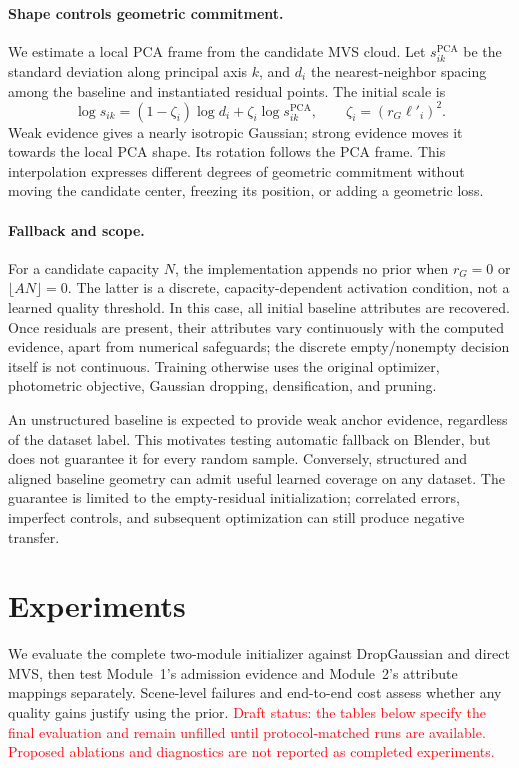 \documentclass{article}
\newcommand{\PH}[1]{\textcolor{red}{#1}}
\begin{document}
\paragraph{Shape controls geometric commitment.}
We estimate a local PCA frame from the candidate MVS cloud. Let $s^{\mathrm{PCA}}_{ik}$ be the standard deviation along principal axis $k$, and $d_i$ the nearest-neighbor spacing among the baseline and instantiated residual points. The initial scale is
\begin{equation}
\log s_{ik}=(1-\zeta_i)\log d_i+
\zeta_i\log s^{\mathrm{PCA}}_{ik},
\qquad
\zeta_i=(r_G\ell'_i)^2.
\label{eq:shape}
\end{equation}
Weak evidence gives a nearly isotropic Gaussian; strong evidence moves it towards the local PCA shape. Its rotation follows the PCA frame. This interpolation expresses different degrees of geometric commitment without moving the candidate center, freezing its position, or adding a geometric loss.

\paragraph{Fallback and scope.}
For a candidate capacity $N$, the implementation appends no prior when $r_G=0$ or $\lfloor AN\rfloor=0$. The latter is a discrete, capacity-dependent activation condition, not a learned quality threshold. In this case, all initial baseline attributes are recovered. Once residuals are present, their attributes vary continuously with the computed evidence, apart from numerical safeguards; the discrete empty/nonempty decision itself is not continuous. Training otherwise uses the original optimizer, photometric objective, Gaussian dropping, densification, and pruning.

An unstructured baseline is expected to provide weak anchor evidence, regardless of the dataset label. This motivates testing automatic fallback on Blender, but does not guarantee it for every random sample. Conversely, structured and aligned baseline geometry can admit useful learned coverage on any dataset. The guarantee is limited to the empty-residual initialization; correlated errors, imperfect controls, and subsequent optimization can still produce negative transfer.

\section{Experiments}
\label{sec:exp}

We evaluate the complete two-module initializer against DropGaussian and direct MVS, then test Module~1's admission evidence and Module~2's attribute mappings separately. Scene-level failures and end-to-end cost assess whether any quality gains justify using the prior.
\PH{Draft status: the tables below specify the final evaluation and remain unfilled until protocol-matched runs are available. Proposed ablations and diagnostics are not reported as completed experiments.}
\end{document}
